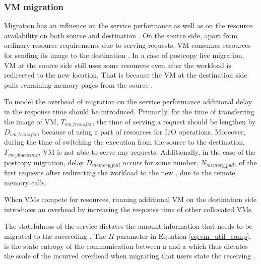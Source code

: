 \subsubsection{VM migration}
Migration has an influence on the service performance as well as on the resource availability on both source and destination \dc{}.
On the source side, apart from ordinary resource requirements due to serving requests, VM consumes resources for sending its image to the destination \dc{}.
In a case of postcopy live migration, VM at the source side still uses some resources even after the workload is redirected to the new location.
That is because the VM at the destination side pulls remaining memory pages from the source \dc{}.


To model the overhead of migration on the service performance additional delay in the response time should be introduced.
Primarily, for the time of transferring the image of VM, $T_{vm\_transfer}$, the time of serving a request should be lengthen by $D_{vm\_transfer}$, because of using a part of resources for I/O operations.
Moreover, during the time of switching the execution from the source to the destination, $T_{vm\_downtime}$, VM is not able to serve any requests.
Additionally, in the case of the postcopy migration, delay  $D_{memory\_pull}$ occurs for some number, $N_{memory\_pull}$, of the first requests after redirecting the workload to the new \dc{}, due to the remote memory calls.

When VMs compete for resources, running additional VM on the destination side introduces an overhead by increasing the response time of other collocated VMs.

The statefulness of the service dictates the amount information that needs to be migrated to the succeeding \dc. The $H$ parameter in Equation \ref{eq:vm_util_comp}, is the state entropy of the communication between a \ue and a \dc which thus dictates the scale of the incurred overhead when migrating that users state the receiving \dc.
